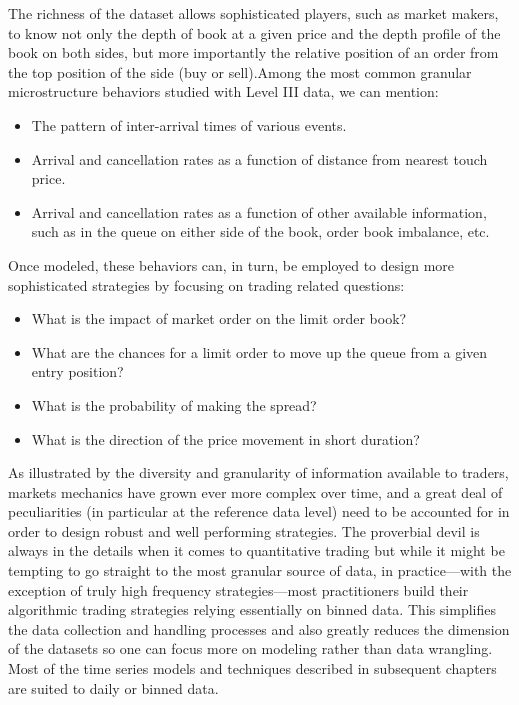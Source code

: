 The richness of the dataset allows sophisticated players, such as market makers, to know not only the depth of book at a given price and the depth profile of the book on both sides, but more importantly the relative position of an order from the top position of the side (buy or sell).Among the most common granular microstructure behaviors studied with Level III data, we can mention:
        \begin{itemize}
        \item The pattern of inter-arrival times of various events.
        \item Arrival and cancellation rates as a function of distance from nearest touch price.
        \item Arrival and cancellation rates as a function of other available information, such as in the queue on either side of the book, order book imbalance, etc.
        \end{itemize}
Once modeled, these behaviors can, in turn, be employed to design more sophisticated strategies by focusing on trading related questions:
        \begin{itemize}
        \item What is the impact of market order on the limit order book?
        \item What are the chances for a limit order to move up the queue from a given entry position?
        \item What is the probability of making the spread?
        \item What is the direction of the price movement in short duration?
        \end{itemize}


As illustrated by the diversity and granularity of information available to traders, markets mechanics have grown ever more complex over time, and a great deal of peculiarities (in particular at the reference data level) need to be accounted for in order to design robust and well performing strategies. The proverbial devil is always in the details when it comes to quantitative trading but while it might be tempting to go straight to the most granular source of data, in practice---with the exception of truly high frequency strategies---most practitioners build their algorithmic trading strategies relying essentially on binned data. This simplifies the data collection and handling processes and also greatly reduces the dimension of the datasets so one can focus more on modeling rather than data wrangling. Most of the time series models and techniques described in subsequent chapters are suited to daily or binned data.



